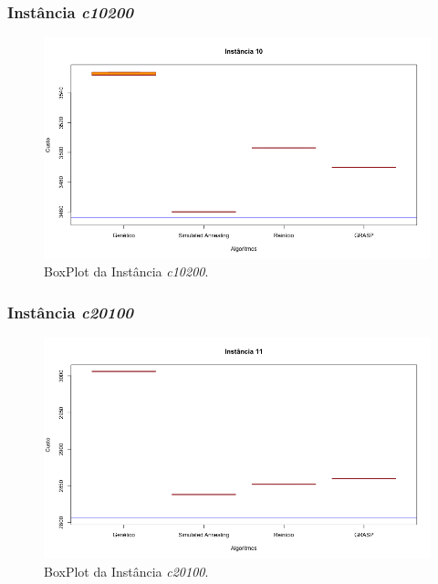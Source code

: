 \documentclass[portugues, brazil, a4paper,12pt]{article}
\begin{document}
		\subsubsection{Instância \textit{c10200}}
			\begin{figure}[H]
				\centering
				\includegraphics[width=1\linewidth]{img/10.png}
				\caption{BoxPlot da Instância \textit{c10200}.}
				\label{fig:c10200}
			\end{figure}
	
		\subsubsection{Instância \textit{c20100}}
			\begin{figure}[H]
				\centering
				\includegraphics[width=1\linewidth]{img/11.png}
				\caption{BoxPlot da Instância \textit{c20100}.}
				\label{fig:c20100}
			\end{figure}
	
\end{document}

